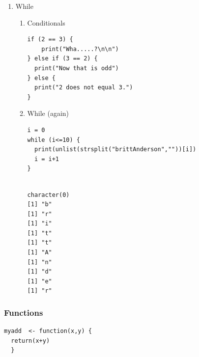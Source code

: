 \documentclass{article}
\begin{document}
\begin{enumerate}
\begin{enumerate}
\begin{verbatim}
myName = "brittAnderson"
myList = unlist(strsplit(b,""))

for (l in myList){
  print(l)
}



for (l in myList[order(myList)]){
  print(l)
}

i = 1
for (n in order(myList)){
  t  <- sprintf("The %.0fth letter of myList is: %s, but is %s in the sorted list.",i,myList[i],myList[n])
  print(t)
  i = i+1  
  }
\end{verbatim}

\begin{verbatim}

Error in strsplit(b, "") : object 'b' not found

Error in myList : object 'myList' not found

Error in myList : object 'myList' not found

Error in order(myList) : object 'myList' not found
\end{verbatim}
\end{enumerate}

\item While
\label{sec:org78b2b99}
\begin{enumerate}
\item Conditionals
\label{sec:org05b2aee}
\begin{verbatim}
if (2 == 3) {
    print("Wha.....?\n\n")
} else if (3 == 2) {
  print("Now that is odd")
} else {
  print("2 does not equal 3.")
}
\end{verbatim}
\item While (again)
\label{sec:org2bf9d99}
\begin{verbatim}
i = 0
while (i<=10) {
  print(unlist(strsplit("brittAnderson",""))[i])
  i = i+1
}
\end{verbatim}

\begin{verbatim}

character(0)
[1] "b"
[1] "r"
[1] "i"
[1] "t"
[1] "t"
[1] "A"
[1] "n"
[1] "d"
[1] "e"
[1] "r"
\end{verbatim}
\end{enumerate}
\end{enumerate}


\subsubsection{Functions}
\label{sec:org92b0c3f}
\begin{verbatim}
myadd  <- function(x,y) {
  return(x+y)
  }
\end{verbatim}
\end{document}
